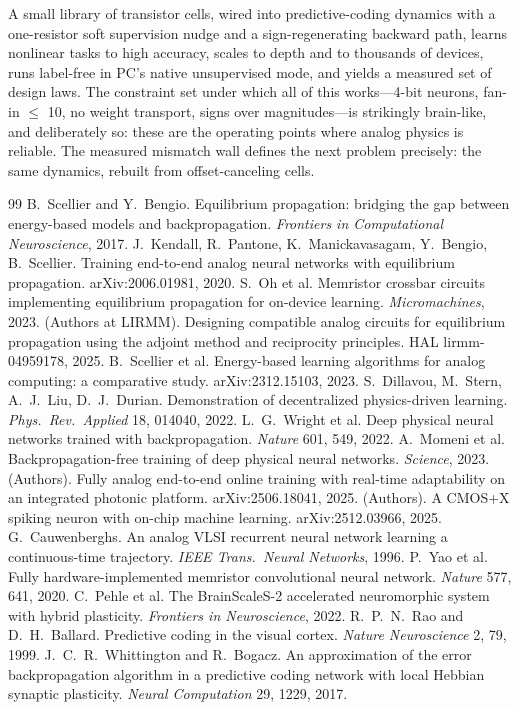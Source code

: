 \documentclass[11pt]{article}
\begin{document}
A small library of transistor cells, wired into predictive-coding dynamics with a one-resistor soft supervision nudge and a sign-regenerating backward path, learns nonlinear tasks to high accuracy, scales to depth and to thousands of devices, runs label-free in PC's native unsupervised mode, and yields a measured set of design laws. The constraint set under which all of this works---4-bit neurons, fan-in $\le$ 10, no weight transport, signs over magnitudes---is strikingly brain-like, and deliberately so: these are the operating points where analog physics is reliable. The measured mismatch wall defines the next problem precisely: the same dynamics, rebuilt from offset-canceling cells.

\begin{thebibliography}{99}\small
{} B.~Scellier and Y.~Bengio. Equilibrium propagation: bridging the gap between energy-based models and backpropagation. \emph{Frontiers in Computational Neuroscience}, 2017.
 J.~Kendall, R.~Pantone, K.~Manickavasagam, Y.~Bengio, B.~Scellier. Training end-to-end analog neural networks with equilibrium propagation. arXiv:2006.01981, 2020.
 S.~Oh et al. Memristor crossbar circuits implementing equilibrium propagation for on-device learning. \emph{Micromachines}, 2023.
 (Authors at LIRMM). Designing compatible analog circuits for equilibrium propagation using the adjoint method and reciprocity principles. HAL lirmm-04959178, 2025.
 B.~Scellier et al. Energy-based learning algorithms for analog computing: a comparative study. arXiv:2312.15103, 2023.
 S.~Dillavou, M.~Stern, A.~J.~Liu, D.~J.~Durian. Demonstration of decentralized physics-driven learning. \emph{Phys.\ Rev.\ Applied} 18, 014040, 2022.
 L.~G.~Wright et al. Deep physical neural networks trained with backpropagation. \emph{Nature} 601, 549, 2022.
 A.~Momeni et al. Backpropagation-free training of deep physical neural networks. \emph{Science}, 2023.
 (Authors). Fully analog end-to-end online training with real-time adaptability on an integrated photonic platform. arXiv:2506.18041, 2025.
 (Authors). A CMOS+X spiking neuron with on-chip machine learning. arXiv:2512.03966, 2025.
 G.~Cauwenberghs. An analog VLSI recurrent neural network learning a continuous-time trajectory. \emph{IEEE Trans.\ Neural Networks}, 1996.
 P.~Yao et al. Fully hardware-implemented memristor convolutional neural network. \emph{Nature} 577, 641, 2020.
 C.~Pehle et al. The BrainScaleS-2 accelerated neuromorphic system with hybrid plasticity. \emph{Frontiers in Neuroscience}, 2022.
 R.~P.~N.~Rao and D.~H.~Ballard. Predictive coding in the visual cortex. \emph{Nature Neuroscience} 2, 79, 1999.
 J.~C.~R.~Whittington and R.~Bogacz. An approximation of the error backpropagation algorithm in a predictive coding network with local Hebbian synaptic plasticity. \emph{Neural Computation} 29, 1229, 2017.
\end{thebibliography}
\end{document}
